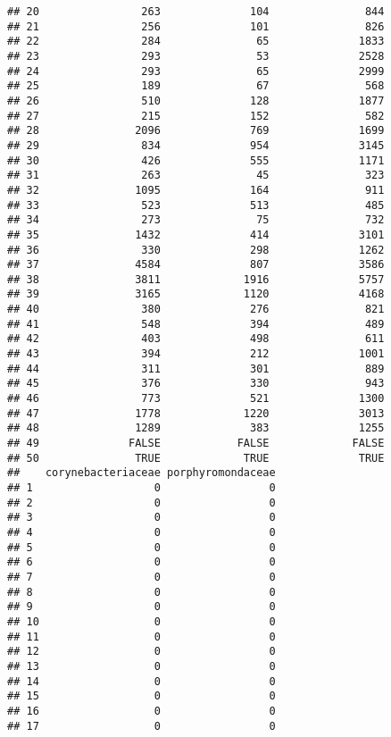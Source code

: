\documentclass[12pt]{beamer}\usepackage[]{graphicx}\usepackage[]{color}
\makeatletter
\newenvironment{kframe}{%
 \def\at@end@of@kframe{}%
 \ifinner\ifhmode%
  \def\at@end@of@kframe{\end{minipage}}%
  \begin{minipage}{\columnwidth}%
 \fi\fi%
 \def\FrameCommand##1{\hskip\@totalleftmargin \hskip-\fboxsep
 \colorbox{shadecolor}{##1}\hskip-\fboxsep
     \hskip-\linewidth \hskip-\@totalleftmargin \hskip\columnwidth}%
 \MakeFramed {\advance\hsize-\width
   \@totalleftmargin\z@ \linewidth\hsize
   \@setminipage}}%
 {\par\unskip\endMakeFramed%
 \at@end@of@kframe}
\newenvironment{knitrout}{}{} %
\makeatother
\begin{document}
\begin{frame}[fragile]
\begin{knitrout}
\begin{kframe}
\begin{verbatim}
## 20                263              104               844
## 21                256              101               826
## 22                284               65              1833
## 23                293               53              2528
## 24                293               65              2999
## 25                189               67               568
## 26                510              128              1877
## 27                215              152               582
## 28               2096              769              1699
## 29                834              954              3145
## 30                426              555              1171
## 31                263               45               323
## 32               1095              164               911
## 33                523              513               485
## 34                273               75               732
## 35               1432              414              3101
## 36                330              298              1262
## 37               4584              807              3586
## 38               3811             1916              5757
## 39               3165             1120              4168
## 40                380              276               821
## 41                548              394               489
## 42                403              498               611
## 43                394              212              1001
## 44                311              301               889
## 45                376              330               943
## 46                773              521              1300
## 47               1778             1220              3013
## 48               1289              383              1255
## 49              FALSE            FALSE             FALSE
## 50               TRUE             TRUE              TRUE
##    corynebacteriaceae porphyromondaceae
## 1                   0                 0
## 2                   0                 0
## 3                   0                 0
## 4                   0                 0
## 5                   0                 0
## 6                   0                 0
## 7                   0                 0
## 8                   0                 0
## 9                   0                 0
## 10                  0                 0
## 11                  0                 0
## 12                  0                 0
## 13                  0                 0
## 14                  0                 0
## 15                  0                 0
## 16                  0                 0
## 17                  0                 0

\end{verbatim}
\end{kframe}
\end{knitrout}
\end{frame}
\end{document}
